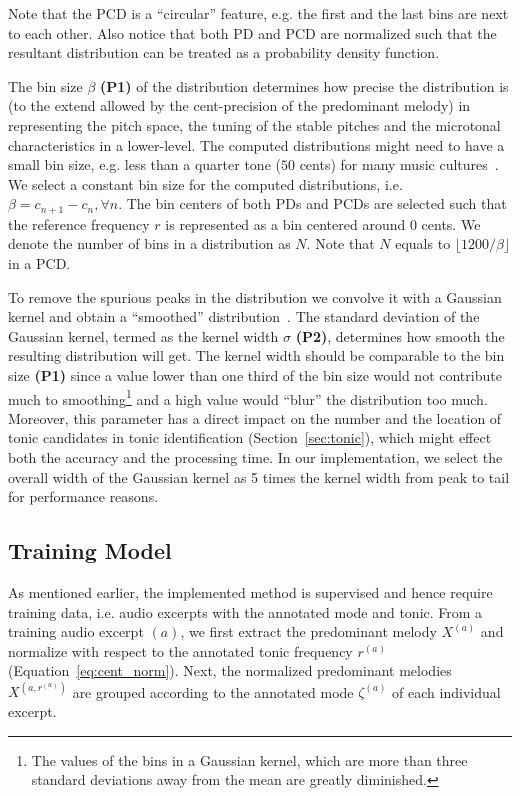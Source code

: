 \documentclass{sig-alternate}
\begin{document}
Note that the PCD is a ``circular'' feature, e.g. the first and the last bins are next to each other. Also notice that both PD and PCD are normalized such that the resultant distribution can be treated as a probability density function. 

The bin size $\beta$ {\bf (P1)} of the distribution determines how precise the distribution is (to the extend allowed by the cent-precision of the predominant melody) in representing the pitch space, the tuning of the stable pitches and the microtonal characteristics in a lower-level. The computed distributions might need to have a small bin size, e.g. less than a quarter tone ($50$ cents) for many music cultures~\cite{chordia,bozkurt_makam}. We select a constant bin size for the computed distributions, i.e. $\beta = c_{n+1} - c_{n},  \forall n$. The bin centers of both PDs and PCDs are selected such that the reference frequency $r$ is represented as a bin centered around $0$ cents. We denote the number of bins in a distribution as $N$. Note that $N$ equals to $\lfloor1200 / \beta\rfloor$ in a PCD.

To remove the spurious peaks in the distribution we convolve it with a Gaussian kernel and obtain a ``smoothed'' distribution~\cite{chordia}. The standard deviation of the Gaussian kernel, termed as the kernel width $\sigma$ {\bf (P2)}, determines how smooth the resulting distribution will get. The kernel width should be comparable to the bin size {\bf (P1)} since a value lower than one third of the bin size would not contribute much to smoothing\footnote{The values of the bins in a Gaussian kernel, which are more than three standard deviations away from the mean are greatly diminished.} and a high value would ``blur''  the distribution too much. Moreover, this parameter has a direct impact on the number and the location of tonic candidates in tonic identification (Section~\ref{sec:tonic}), which might effect both the accuracy and the processing time. In our implementation, we select the overall width of the Gaussian kernel as 5 times the kernel width from peak to tail for performance reasons.

\subsection{Training Model}\label{sec:training}
As mentioned earlier, the implemented method is supervised and hence require training data, i.e. audio excerpts with the annotated mode and tonic. From a training audio excerpt $(a)$, we first extract the predominant me\-lody $X^{(a)}$ and normalize with respect to the annotated tonic frequency $r^{(a)}$ (Equation~\ref{eq:cent_norm}). Next, the normalized predominant melo\-dies $X^{\left(a, r^{(a)}\right)}$ are grouped according to the annotated mode $\zeta^{(a)}$ of each individual excerpt. 
\end{document}

